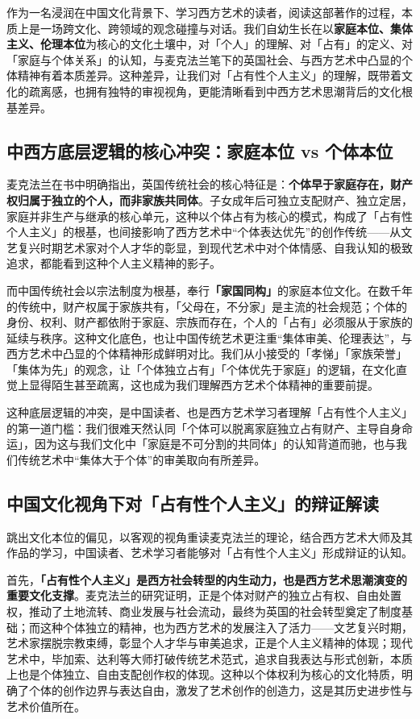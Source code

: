 \documentclass[12pt,a4paper]{article}
\begin{document}
作为一名浸润在中国文化背景下、学习西方艺术的读者，阅读这部著作的过程，本质上是一场跨文化、跨领域的观念碰撞与对话。我们自幼生长在以\textbf{家庭本位、集体主义、伦理本位}为核心的文化土壤中，对「个人」的理解、对「占有」的定义、对「家庭与个体关系」的认知，与麦克法兰笔下的英国社会、与西方艺术中凸显的个体精神有着本质差异。这种差异，让我们对「占有性个人主义」的理解，既带着文化的疏离感，也拥有独特的审视视角，更能清晰看到中西方艺术思潮背后的文化根基差异。

\subsection*{中西方底层逻辑的核心冲突：家庭本位 vs 个体本位}
麦克法兰在书中明确指出，英国传统社会的核心特征是：\textbf{个体早于家庭存在，财产权归属于独立的个人，而非家族共同体}。子女成年后可独立支配财产、独立定居，家庭并非生产与继承的核心单元，这种以个体占有为核心的模式，构成了「占有性个人主义」的根基，也间接影响了西方艺术中“个体表达优先”的创作传统——从文艺复兴时期艺术家对个人才华的彰显，到现代艺术中对个体情感、自我认知的极致追求，都能看到这种个人主义精神的影子。

而中国传统社会以宗法制度为根基，奉行\textbf{「家国同构」}的家庭本位文化。在数千年的传统中，财产权属于家族共有，「父母在，不分家」是主流的社会规范；个体的身份、权利、财产都依附于家庭、宗族而存在，个人的「占有」必须服从于家族的延续与秩序。这种文化底色，也让中国传统艺术更注重“集体审美、伦理表达”，与西方艺术中凸显的个体精神形成鲜明对比。我们从小接受的「孝悌」「家族荣誉」「集体为先」的观念，让「个体独立占有」「个体优先于家庭」的逻辑，在文化直觉上显得陌生甚至疏离，这也成为我们理解西方艺术个体精神的重要前提。

这种底层逻辑的冲突，是中国读者、也是西方艺术学习者理解「占有性个人主义」的第一道门槛：我们很难天然认同「个体可以脱离家庭独立占有财产、主导自身命运」，因为这与我们文化中「家庭是不可分割的共同体」的认知背道而驰，也与我们传统艺术中“集体大于个体”的审美取向有所差异。

\subsection*{中国文化视角下对「占有性个人主义」的辩证解读}
跳出文化本位的偏见，以客观的视角重读麦克法兰的理论，结合西方艺术大师及其作品的学习，中国读者、艺术学习者能够对「占有性个人主义」形成辩证的认知。

首先，\textbf{「占有性个人主义」是西方社会转型的内生动力，也是西方艺术思潮演变的重要文化支撑}。麦克法兰的研究证明，正是个体对财产的独立占有权、自由处置权，推动了土地流转、商业发展与社会流动，最终为英国的社会转型奠定了制度基础；而这种个体独立的精神，也为西方艺术的发展注入了活力——文艺复兴时期，艺术家摆脱宗教束缚，彰显个人才华与审美追求，正是个人主义精神的体现；现代艺术中，毕加索、达利等大师打破传统艺术范式，追求自我表达与形式创新，本质上也是个体独立、自由支配创作权的体现。这种以个体权利为核心的文化特质，明确了个体的创作边界与表达自由，激发了艺术创作的创造力，这是其历史进步性与艺术价值所在。
\end{document}
